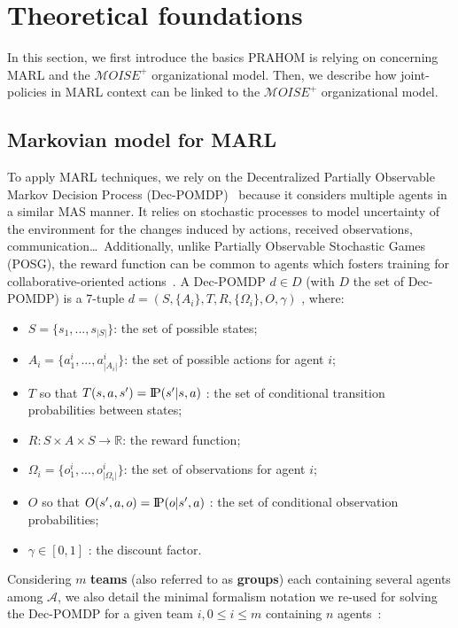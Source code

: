 \documentclass[runningheads]{llncs}
\theoremstyle{freethm}
\theoremstyle{proofoutline}
\newcommand{\probP}{\text{I\kern-0.15em P}}
\begin{document}
\section{Theoretical foundations}

In this section, we first introduce the basics PRAHOM is relying on concerning MARL and the $\mathcal{M}OISE^{+}$ organizational model. Then, we  describe how joint-policies in MARL context can be linked to the $\mathcal{M}OISE^{+}$ organizational model.

\subsection{Markovian model for MARL}

To apply MARL techniques, we rely on the Decentralized Partially Observable Markov Decision Process (Dec-POMDP)~\cite{Oliehoek2016} because it considers multiple agents in a similar MAS manner. It relies on stochastic processes to model uncertainty of the environment for the changes induced by actions, received observations, communication\dots \ Additionally, unlike Partially Observable Stochastic Games (POSG), the reward function can be common to agents which fosters training for collaborative-oriented actions~\cite{Beynier2013}.
A Dec-POMDP $d \in D$ (with $D$ the set of Dec-POMDP) is a 7-tuple $d = (S,\{A_i\},T,R,\{\Omega_i\},O,\gamma)$ , where:
\begin{itemize}
    \item $S = \{s_1,...,s_{|S|}\}$: the set of possible states;
    \item $A_{i} = \{a_{1}^{i},...,a_{|A_{i}|}^{i}\}$: the set of possible actions for agent $i$;
    \item $T$ so that $T(s,a,s') = \probP{(s'|s,a)}$ : the set of conditional transition probabilities between states;
    \item $R: S \times A \times S \rightarrow \mathbb{R}$: the reward function;
    \item $\Omega_{i} = \{o_{1}^{i},...,o_{|\Omega_{i}|}^{i}\}$: the set of observations for agent $i$;
    \item $O$ so that $O(s',a,o) = \probP{(o|s',a)}$ : the set of conditional observation probabilities;
    \item $\gamma \in [0,1]$ : the discount factor.
\end{itemize}

Considering $m$ \textbf{teams} (also referred to as \textbf{groups}) each containing several agents among $\mathcal{A}$, we also detail the minimal formalism notation we re-used for solving the Dec-POMDP for a given team $i, 0 \leq i \leq m$ containing $n$ agents~\cite{Beynier2013,Albrecht2024}:
\end{document}
